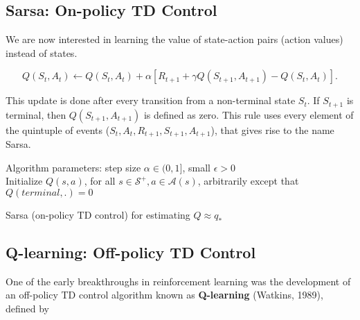 \documentclass[11pt]{article}
\begin{document}
\subsection{Sarsa: On-policy TD Control}
\label{sec:orge205634}

We are now interested in learning the value of state-action pairs (action
values) instead of states.

\begin{equation}
Q(S_t, A_t) \leftarrow Q(S_t, A_t) + \alpha [R_{t+1} + \gamma Q(S_{t+1}, A_{t+1}) - Q(S_t, A_t)].
\end{equation}

This update is done after every transition from a non-terminal state \(S_t\). If
\(S_{t+1}\) is terminal, then \(Q(S_{t+1}, A_{t+1})\) is defined as zero. This rule
uses every element of the quintuple of events (\(S_t, A_t, R_{t+1}, S_{t+1},
A_{t+1}\)), that gives rise to the name Sarsa.
\newline
\newline
\begin{algorithm}[H]
Algorithm parameters: step size $\alpha \in (0,1]$, small $\epsilon > 0$ \\
Initialize $Q(s,a)$, for all $s \in \mathcal{S}^+, a \in \mathcal{A}(s)$, arbitrarily except that $Q(terminal, .) = 0$ \\

\;
\;
\caption{Sarsa (on-policy TD control) for estimating $Q \approx q_*$}
\end{algorithm}

\subsection{Q-learning: Off-policy TD Control}
\label{sec:orgf4aa38f}

One of the early breakthroughs in reinforcement learning was the development of
an off-policy TD control algorithm known as \textbf{Q-learning} (Watkins, 1989),
defined by
\end{document}
